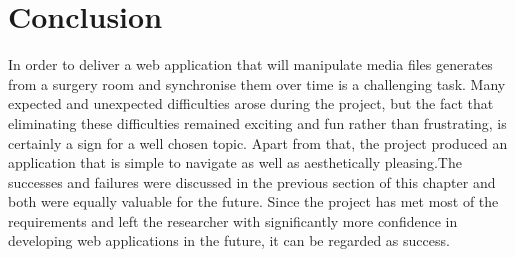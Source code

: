 \section{Conclusion}
In order to deliver a web application that will manipulate media files generates from a surgery room  and synchronise them over time is a challenging task.  Many expected and unexpected difficulties arose during the project, but the
fact that eliminating these difficulties remained exciting and fun rather than frustrating, is certainly a sign for a well chosen topic. Apart from that, the project produced an application that is simple to navigate as well as aesthetically pleasing.The successes and failures
were discussed in the previous section of this chapter and both were equally valuable for the future. Since the project has met most of the requirements and left the researcher with significantly more confidence in developing web applications in the future, it can be regarded as success.





